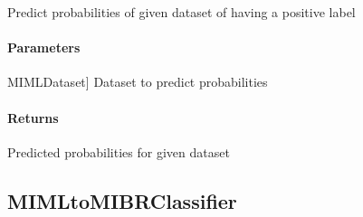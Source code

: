 \documentclass[letterpaper,10pt,english]{sphinxmanual}
\begin{document}
\begin{fulllineitems}
\begin{fulllineitems}
\label{\detokenize{classifier/mimlTOmi/_autosummary/miml.classifier.mimlTOmi.miml_to_mi_classifier.MIMLtoMIClassifier:miml.classifier.mimlTOmi.miml_to_mi_classifier.MIMLtoMIClassifier.predict_proba}}
\pysigstartsignatures
{}
\pysigstopsignatures
\sphinxAtStartPar
Predict probabilities of given dataset of having a positive label


\paragraph{Parameters}
\label{\detokenize{classifier/mimlTOmi/_autosummary/miml.classifier.mimlTOmi.miml_to_mi_classifier.MIMLtoMIClassifier:id7}}\begin{description}
\sphinxlineitem{dataset\_test}{[}MIMLDataset{]}
\sphinxAtStartPar
Dataset to predict probabilities

\end{description}


\paragraph{Returns}
\label{\detokenize{classifier/mimlTOmi/_autosummary/miml.classifier.mimlTOmi.miml_to_mi_classifier.MIMLtoMIClassifier:id8}}\begin{description}
\sphinxAtStartPar
Predicted probabilities for given dataset

\end{description}

\end{fulllineitems}


\end{fulllineitems}


\sphinxstepscope


\subsection{MIMLtoMIBRClassifier}
\label{\detokenize{classifier/mimlTOmi/miml_to_mi_br_classifier:mimltomibrclassifier}}\label{\detokenize{classifier/mimlTOmi/miml_to_mi_br_classifier::doc}}
\end{document}
